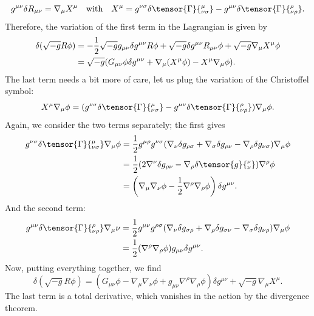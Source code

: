 \begin{solution}
\begin{equation}
        g^{\mu\nu}\delta R_{\mu\nu} = \nabla_\mu X^\mu \quad    \text{with} \quad X^\mu = g^{\nu\sigma} \delta\tensor{\Gamma}{^\mu_{\nu\sigma}} - g^{\mu\nu}\delta\tensor{\Gamma}{^\rho_{\nu\rho}}.
    \end{equation}
    Therefore, the variation of the first term in the Lagrangian is given by
    \begin{align}
        \delta(\sqrt{-g}R\phi) &= -\frac{1}{2}\sqrt{-g}g_{\mu\nu}\delta g^{\mu\nu}R\phi+ \sqrt{-g}\delta g^{\mu\nu}R_{\mu\nu}\phi+\sqrt{-g}\nabla_\mu X^\mu \phi\notag\\ &= \sqrt{-g}(G_{\mu\nu}\phi\delta g^{\mu\nu}+\nabla_\mu( X^\mu \phi) -X^\mu \nabla_\mu\phi).
    \end{align}
    The last term needs a bit more of care, let us plug the variation of the Christoffel symbol:
    \begin{equation}
        X^\mu \nabla_\mu \phi = (g^{\nu\sigma} \delta\tensor{\Gamma}{^\mu_{\nu\sigma}} - g^{\mu\nu}\delta\tensor{\Gamma}{^\rho_{\nu\rho}})\nabla_\mu\phi.
    \end{equation}
    Again, we consider the two terms separately; the first gives
    \begin{align}
        g^{\nu\sigma} \delta\tensor{\Gamma}{^\mu_{\nu\sigma}}\nabla_\mu\phi &= \frac{1}{2}g^{\mu\rho}g^{\nu\sigma}(\nabla_\nu\delta g_{\rho\sigma} +\nabla_\sigma\delta g_{\rho\nu} - \nabla_\rho\delta g_{\nu\sigma})\nabla_\mu\phi \notag \\
        &= \frac{1}{2}(2\nabla^\nu\delta g_{\rho\nu}-\nabla_\rho \delta \tensor{g}{^\nu_\nu})\nabla^\rho \phi\notag\\
        &=\left(\nabla_\mu\nabla_\nu\phi - \frac{1}{2}\nabla^\rho\nabla_\rho\phi\right)\delta g^{\mu\nu}.
    \end{align}
    And the second term:
    \begin{align}
        g^{\mu\nu}\delta\tensor{\Gamma}{^\rho_{\nu\rho}}\nabla_\mu\nu &= \frac{1}{2}g^{\mu\nu}g^{\rho\sigma}(\nabla_\nu\delta g_{\sigma\rho} +\nabla_\rho\delta g_{\sigma\nu} - \nabla_\sigma\delta g_{\nu\rho})\nabla_\mu\phi\notag\\
        &=\frac{1}{2}(\nabla^\rho\nabla_\rho\phi) g_{\mu\nu}\delta g^{\mu\nu}.
    \end{align}
    Now, putting everything together, we find
    \begin{equation}
        \delta(\sqrt{-g}R\phi) = (G_{\mu\nu}\phi-\nabla_\mu\nabla_\nu \phi + g_{\mu\nu}\nabla^\rho\nabla_\rho\phi)\delta g^{\mu\nu} + \sqrt{-g}\nabla_\mu X^\mu.
    \end{equation}
    The last term is a total derivative, which vanishes in the action by the divergence theorem.


\end{solution}

